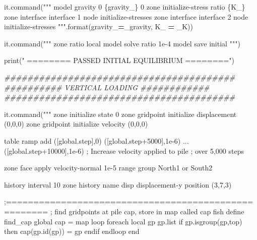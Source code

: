 \documentclass[a4paper, nobind]{templates/ociamthesis}
\newenvironment{Shaded}{\begin{snugshade}}{\end{snugshade}}
\newcommand{\BuiltInTok}[1]{#1}
\newcommand{\CommentTok}[1]{\textcolor[rgb]{0.56,0.35,0.01}{\textit{#1}}}
\newcommand{\NormalTok}[1]{#1}
\newcommand{\OperatorTok}[1]{\textcolor[rgb]{0.81,0.36,0.00}{\textbf{#1}}}
\newcommand{\SpecialCharTok}[1]{\textcolor[rgb]{0.00,0.00,0.00}{#1}}
\newcommand{\StringTok}[1]{\textcolor[rgb]{0.31,0.60,0.02}{#1}}
\renewenvironment{Shaded}
{
  \vspace{10pt}%
  \begin{snugshade}%
}{%
  \end{snugshade}%
  \vspace{8pt}%
}
\begin{document}
\begin{Shaded}
\begin{Highlighting}[]
\NormalTok{it.command(}\StringTok{"""}
\StringTok{model gravity 0 }\SpecialCharTok{\{gravity\_\}}\StringTok{ 0}
\StringTok{zone initialize{-}stress ratio }\SpecialCharTok{\{K\_\}}
\StringTok{zone interface \textquotesingle{}interface 1\textquotesingle{} node initialize{-}stresses}
\StringTok{zone interface \textquotesingle{}interface 2\textquotesingle{} node initialize{-}stresses}
\StringTok{"""}\NormalTok{.}\BuiltInTok{format}\NormalTok{(gravity\_}\OperatorTok{=}\NormalTok{\_gravity, K\_ }\OperatorTok{=}\NormalTok{ \_K))}

\NormalTok{it.command(}\StringTok{"""}
\StringTok{zone ratio local}
\StringTok{model solve ratio 1e{-}4}
\StringTok{model save \textquotesingle{}initial\textquotesingle{}}
\StringTok{"""}\NormalTok{)}

\BuiltInTok{print}\NormalTok{(}\StringTok{"               ======== PASSED INITIAL EQUILIBRIUM ========"}\NormalTok{)}

\CommentTok{\#\#\#\#\#\#\#\#\#\#\#\#\#\#\#\#\#\#\#\#\#\#\#\#\#\#\#\#\#\#\#\#\#\#\#\#\#\#\#\#}
\CommentTok{\#\#\#\#\#\#\#\#\#\# VERTICAL LOADING \#\#\#\#\#\#\#\#\#\#\#\#}
\CommentTok{\#\#\#\#\#\#\#\#\#\#\#\#\#\#\#\#\#\#\#\#\#\#\#\#\#\#\#\#\#\#\#\#\#\#\#\#\#\#\#\#}

\NormalTok{it.command(}\StringTok{"""}
\StringTok{zone initialize state 0}
\StringTok{zone gridpoint initialize displacement (0,0,0)}
\StringTok{zone gridpoint initialize velocity     (0,0,0)}

\StringTok{table \textquotesingle{}ramp\textquotesingle{} add ([global.step],0) ([global.step+5000],1e{-}6) ...}
\StringTok{      ([global.step+10000],1e{-}6) ; Increase velocity applied to pile}
\StringTok{                                  ; over 5,000 steps}
\StringTok{                                 }


\StringTok{zone face apply velocity{-}normal 1e{-}5 range group \textquotesingle{}North1\textquotesingle{} or \textquotesingle{}South2\textquotesingle{}}


\StringTok{history interval 10}
\StringTok{zone history name \textquotesingle{}disp\textquotesingle{} displacement{-}y position (3,7,3)}

\StringTok{;=====================================================}
\StringTok{; find gridpoints at pile cap, store in map called cap}
\StringTok{fish define find\_cap}
\StringTok{    global cap = map}
\StringTok{    loop foreach local gp gp.list}
\StringTok{        if gp.isgroup(gp,\textquotesingle{}top\textquotesingle{}) then}
\StringTok{            cap(gp.id(gp)) = gp}
\StringTok{        endif}
\StringTok{    endloop}
\StringTok{end}


\end{Highlighting}
\end{Shaded}
\end{document}
